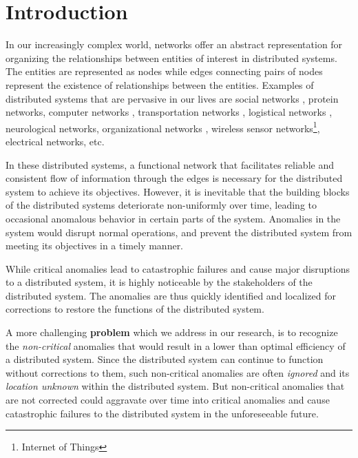 \documentclass[conference]{IEEEtran.1.8}
\begin{document}
\section{Introduction}
\label{sec:intro}

In our increasingly complex world, networks offer an abstract representation for organizing the relationships between entities of interest in distributed systems. The entities are represented as nodes while edges connecting pairs of nodes represent the existence of relationships between the entities. Examples of distributed systems that are pervasive in our lives are social networks \cite{Wu2004}, protein networks, computer networks \cite{Kind2009, Sengar2009}, transportation networks \cite{Fadlil2013, Yuan2013}, logistical networks \cite{Agovic2009}, neurological networks, organizational networks \cite{Mihm2010}, wireless sensor networks\footnote{Internet of Things}, electrical networks, etc.

In these distributed systems, a functional network that facilitates reliable and consistent flow of information through the edges is necessary for the distributed system to achieve its objectives. However, it is inevitable that the building blocks of the distributed systems deteriorate non-uniformly over time, leading to occasional anomalous behavior in certain parts of the system. Anomalies in the system would disrupt normal operations, and prevent the distributed system from meeting its objectives in a timely manner.

While critical anomalies lead to catastrophic failures and cause major disruptions to a distributed system, it is highly noticeable by the stakeholders of the distributed system. The anomalies are thus quickly identified and localized for corrections to restore the functions of the distributed system.

A more challenging \textbf{problem} which we address in our research, is to recognize the \emph{non-critical} anomalies that would result in a lower than optimal efficiency of a distributed system. Since the distributed system can continue to function without corrections to them, such non-critical anomalies are often \emph{ignored} and its \emph{location unknown} within the distributed system. But non-critical anomalies that are not corrected could aggravate over time into critical anomalies and cause catastrophic failures to the distributed system in the unforeseeable future. 
\end{document}
